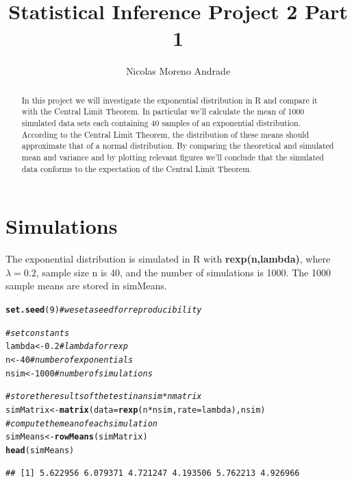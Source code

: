 \documentclass{article}\usepackage[]{graphicx}\usepackage[]{color}
\makeatletter
\newcommand{\hlnum}[1]{\textcolor[rgb]{0.686,0.059,0.569}{#1}}%
\newcommand{\hlcom}[1]{\textcolor[rgb]{0.678,0.584,0.686}{\textit{#1}}}%
\newcommand{\hlopt}[1]{\textcolor[rgb]{0,0,0}{#1}}%
\newcommand{\hlstd}[1]{\textcolor[rgb]{0.345,0.345,0.345}{#1}}%
\newcommand{\hlkwb}[1]{\textcolor[rgb]{0.69,0.353,0.396}{#1}}%
\newcommand{\hlkwc}[1]{\textcolor[rgb]{0.333,0.667,0.333}{#1}}%
\newcommand{\hlkwd}[1]{\textcolor[rgb]{0.737,0.353,0.396}{\textbf{#1}}}%
\newenvironment{kframe}{%
 \def\at@end@of@kframe{}%
 \ifinner\ifhmode%
  \def\at@end@of@kframe{\end{minipage}}%
  \begin{minipage}{\columnwidth}%
 \fi\fi%
 \def\FrameCommand##1{\hskip\@totalleftmargin \hskip-\fboxsep
 \colorbox{shadecolor}{##1}\hskip-\fboxsep
     \hskip-\linewidth \hskip-\@totalleftmargin \hskip\columnwidth}%
 \MakeFramed {\advance\hsize-\width
   \@totalleftmargin\z@ \linewidth\hsize
   \@setminipage}}%
 {\par\unskip\endMakeFramed%
 \at@end@of@kframe}
\newenvironment{knitrout}{}{} %
\makeatother
\begin{document}







\title{Statistical Inference Project 2 Part 1}
\author{Nicolas Moreno Andrade}
\maketitle
\begin{abstract}
In this project we will investigate the exponential distribution in R and compare it with the Central Limit Theorem. In particular we'll calculate the mean of 1000 simulated data sets each containing 40 samples of an exponential distribution. According to the Central Limit Theorem, the distribution of these means should approximate that of a normal distribution. By comparing the theoretical and simulated mean and variance and by plotting relevant figures we'll conclude that the simulated data conforms to the expectation of the Central Limit Theorem. 
\end{abstract}

\section{Simulations}

The exponential distribution is simulated in R with \textbf{rexp(n,lambda)}, where $\lambda=0.2$, sample size n is 40, and the number of simulations is 1000. The 1000 sample means are stored in simMeans.

\begin{knitrout}
\color{fgcolor}\begin{kframe}
\begin{alltt}
\hlkwd{set.seed}\hlstd{(}\hlnum{9}\hlstd{)}  \hlcom{# we set a seed for reproducibility}

\hlcom{# set constants}
\hlstd{lambda} \hlkwb{<-} \hlnum{0.2}  \hlcom{# lambda for rexp}
\hlstd{n} \hlkwb{<-} \hlnum{40}  \hlcom{# number of exponentials}
\hlstd{nsim} \hlkwb{<-} \hlnum{1000}  \hlcom{# number of simulations}

\hlcom{# store the results of the test in a nsim * n matrix}
\hlstd{simMatrix} \hlkwb{<-} \hlkwd{matrix}\hlstd{(}\hlkwc{data} \hlstd{=} \hlkwd{rexp}\hlstd{(n} \hlopt{*} \hlstd{nsim,} \hlkwc{rate} \hlstd{= lambda), nsim)}
\hlcom{# compute the mean of each simulation}
\hlstd{simMeans} \hlkwb{<-} \hlkwd{rowMeans}\hlstd{(simMatrix)}
\hlkwd{head}\hlstd{(simMeans)}
\end{alltt}
\begin{verbatim}
## [1] 5.622956 6.079371 4.721247 4.193506 5.762213 4.926966
\end{verbatim}
\end{kframe}
\end{knitrout}
\end{document}
